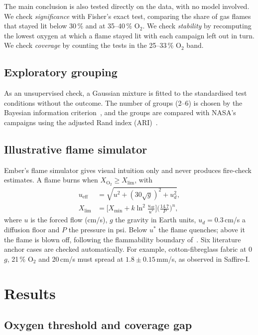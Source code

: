 \documentclass[11pt,twocolumn]{article}
\newcommand{\Otwo}{\ensuremath{\mathrm{O_2}}}
\newcommand{\pct}{\,\%}
\begin{document}
The main conclusion is also tested directly on the data, with no model involved. We check
\emph{significance} with Fisher's exact test, comparing the share of gas flames that stayed lit below
30\pct{} and at 35--40\pct{} \Otwo. We check \emph{stability} by recomputing the lowest oxygen at which a flame
stayed lit with each campaign left out in turn. We check \emph{coverage} by counting the tests in the
25--33\pct{} \Otwo{} band.

\subsection{Exploratory grouping}

As an unsupervised check, a Gaussian mixture is fitted to the standardised test conditions without the
outcome. The number of groups (2--6) is chosen by the Bayesian information criterion~\cite{schwarz1978}, and
the groups are compared with NASA's campaigns using the adjusted Rand index (ARI)~\cite{hubert1985}.

\subsection{Illustrative flame simulator}

Ember's flame simulator gives visual intuition only and never produces fire-check estimates. A flame burns
when $X_{\Otwo} \ge X_{\lim}$, with
\begin{align}
u_{\mathrm{eff}} &= \sqrt{u^2 + (30\sqrt{g})^2 + u_d^2}, \\
X_{\lim} &= \Big[X_{\min} + k \ln^2\!\frac{u_{\mathrm{eff}}}{u^*}\Big]\Big(\frac{14.7}{P}\Big)^{n},
\end{align}
where $u$ is the forced flow (cm/s), $g$ the gravity in Earth units, $u_d = 0.3$\,cm/s a diffusion floor and
$P$ the pressure in psi. Below $u^*$ the flame quenches; above it the flame is blown off, following the
flammability boundary of~\cite{olson1991}. Six literature anchor cases are checked automatically. For
example, cotton-fibreglass fabric at 0\,$g$, 21\pct{} \Otwo{} and 20\,cm/s must spread at
$1.8 \pm 0.15$\,mm/s, as observed in Saffire-I.

\section{Results}

\subsection{Oxygen threshold and coverage gap}
\end{document}
